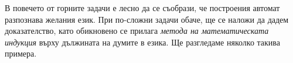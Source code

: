 \begin{solution}
\begin{itemize}
\begin{figure}[H]
\begin{center}
      \end{center}
    \end{figure}
  \end{itemize}
\end{solution}

В повечето от горните задачи е лесно да се съобрази, че построения автомат разпознава желания език.
При по-сложни задачи обаче, ще се наложи да дадем доказателство, като обикновено се прилага 
{\em метода на математическата индукция} върху дължината на думите в езика. 
Ще разгледаме няколко такива примера.

